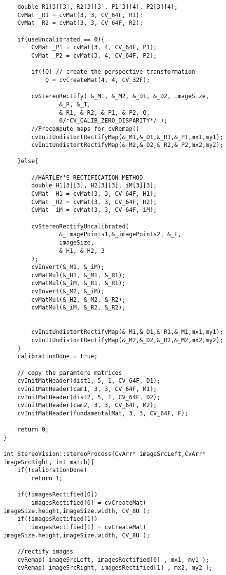 \begin{lstlisting}
    double R1[3][3], R2[3][3], P1[3][4], P2[3][4];
    CvMat _R1 = cvMat(3, 3, CV_64F, R1);
    CvMat _R2 = cvMat(3, 3, CV_64F, R2);

    if(useUncalibrated == 0){
    	CvMat _P1 = cvMat(3, 4, CV_64F, P1);
    	CvMat _P2 = cvMat(3, 4, CV_64F, P2);

    	if(!Q) // create the perspective transformation
    		Q = cvCreateMat(4, 4, CV_32F);

    	cvStereoRectify( &_M1, &_M2, &_D1, &_D2, imageSize,
    			&_R, &_T,
    			&_R1, &_R2, &_P1, &_P2, Q,
    			0/*CV_CALIB_ZERO_DISPARITY*/ );
    	//Precompute maps for cvRemap()
    	cvInitUndistortRectifyMap(&_M1,&_D1,&_R1,&_P1,mx1,my1);
    	cvInitUndistortRectifyMap(&_M2,&_D2,&_R2,&_P2,mx2,my2);

    }else{

    	//HARTLEY'S RECTIFICATION METHOD
    	double H1[3][3], H2[3][3], iM[3][3];
    	CvMat _H1 = cvMat(3, 3, CV_64F, H1);
    	CvMat _H2 = cvMat(3, 3, CV_64F, H2);
    	CvMat _iM = cvMat(3, 3, CV_64F, iM);

    	cvStereoRectifyUncalibrated(
    			&_imagePoints1,&_imagePoints2, &_F,
    			imageSize,
    			&_H1, &_H2, 3
    	);
    	cvInvert(&_M1, &_iM);
    	cvMatMul(&_H1, &_M1, &_R1);
    	cvMatMul(&_iM, &_R1, &_R1);
    	cvInvert(&_M2, &_iM);
    	cvMatMul(&_H2, &_M2, &_R2);
    	cvMatMul(&_iM, &_R2, &_R2);


    	cvInitUndistortRectifyMap(&_M1,&_D1,&_R1,&_M1,mx1,my1);
    	cvInitUndistortRectifyMap(&_M2,&_D2,&_R2,&_M2,mx2,my2);
    }
    calibrationDone = true;

    // copy the paramtere matrices
    cvInitMatHeader(dist1, 5, 1, CV_64F, D1);
    cvInitMatHeader(cam1, 3, 3, CV_64F, M1);
    cvInitMatHeader(dist2, 5, 1, CV_64F, D2);
    cvInitMatHeader(cam2, 3, 3, CV_64F, M2);
    cvInitMatHeader(fundamentalMat, 3, 3, CV_64F, F);

    return 0;
}

int StereoVision::stereoProcess(CvArr* imageSrcLeft,CvArr* imageSrcRight, int match){
    if(!calibrationDone)
    	return 1;

    if(!imagesRectified[0])
    	imagesRectified[0] = cvCreateMat( imageSize.height,imageSize.width, CV_8U );
    if(!imagesRectified[1])
    	imagesRectified[1] = cvCreateMat( imageSize.height,imageSize.width, CV_8U );

    //rectify images
    cvRemap( imageSrcLeft, imagesRectified[0] , mx1, my1 );
    cvRemap( imageSrcRight, imagesRectified[1] , mx2, my2 );


\end{lstlisting}
